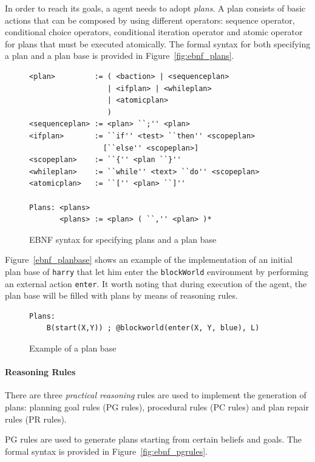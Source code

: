 \documentclass[a4paper]{article}
\begin{document}
In order to reach its goals, a agent needs to adopt \emph{plans}. A plan consists of basic actions that can be composed by using different operators: sequence operator, conditional choice operators, conditional iteration operator and atomic operator for plans that must be executed atomically. The formal syntax for both specifying a plan and a plan base is provided in Figure~\ref{fig:ebnf_plans}.

\begin{figure}[htp]
\begin{verbatim}
<plan>         := ( <baction> | <sequenceplan>
                  | <ifplan> | <whileplan>
                  | <atomicplan>
                  )
<sequenceplan> := <plan> ``;'' <plan>
<ifplan>       := ``if'' <test> ``then'' <scopeplan>
                 [``else'' <scopeplan>]
<scopeplan>    := ``{'' <plan ``}''
<whileplan>    := ``while'' <text> ``do'' <scopeplan>
<atomicplan>   := ``['' <plan> ``]''

Plans: <plans>
       <plans> := <plan> ( ``,'' <plan> )*
\end{verbatim}
\caption{EBNF syntax for specifying plans and a plan base}
\label{fig:ebnf_planbase}
\end{figure}

Figure~\ref{ebnf_planbase} shows an example of the implementation of an initial plan base of \texttt{harry} that let him enter the \texttt{blockWorld} environment by performing an external action \texttt{enter}. It worth noting that during execution of the agent, the plan base will be filled with plans by means of reasoning rules.
 
\begin{figure}[htp]
\begin{verbatim}
Plans:
	B(start(X,Y)) ; @blockworld(enter(X, Y, blue), L)
\end{verbatim}	
\caption{Example of a plan base}
\label{fig:ebnf_planbase}
\end{figure}

\paragraph{Reasoning Rules}

There are three \emph{practical reasoning} rules are used to implement the generation of plans: planning goal rules (PG rules), procedural rules (PC rules) and plan repair rules (PR rules). 

PG rules are used to generate plans starting from certain beliefs and goals. The formal syntax is provided in Figure~\ref{fig:ebnf_pgrules}.
\end{document}

